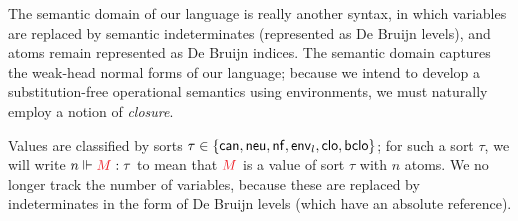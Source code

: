 \documentclass{article}
\DeclarePairedDelimiter\Angles{\langle}{\rangle}
\DeclarePairedDelimiter\Squares{[}{]}
\DeclarePairedDelimiter\Braces{\lbrace}{\rbrace}
\newcommand\FmtKwd[1]{\mathsf{#1}}
\newcommand\FmtThin[1]{{\color{ProcessBlue}#1}}
\newcommand\FmtTm[1]{{\color{Violet}#1}}
\newcommand\FmtVal[1]{{\color{Red}{#1}}}
\begin{document}
The semantic domain of our language is really another syntax, in which
variables are replaced by semantic indeterminates (represented as De
Bruijn levels), and atoms remain represented as De Bruijn indices. The
semantic domain captures the weak-head normal forms of our language;
because we intend to develop a substitution-free operational semantics
using environments, we must naturally employ a notion of
\emph{closure}.

\newcommand\SortCan{\FmtKwd{can}}
\newcommand\SortNeu{\FmtKwd{neu}}
\newcommand\SortNf{\FmtKwd{nf}}
\newcommand\SortClo{\FmtKwd{clo}}
\newcommand\SortBClo{\FmtKwd{bclo}}
\newcommand\SortEnv[1]{\FmtKwd{env}_{#1}}
\newcommand\IsVal[3]{{#1}\Vdash\FmtVal{#2}:{#3}}
\newcommand\Val[2]{{#1}\Vdash{#2}}

\newcommand\Clo[4]{
  \Squares*{
    \FmtThin{#1}%
    \mathbin{\color{gray}*}%
    \Angles*{
      \FmtTm{#4}
      \mathbin{\color{gray}\triangleleft}%
      \FmtThin{#2}
      \mathbin{\color{gray}*}%
      \FmtVal{#3}
    }
  }
}

\newcommand\BClo[4]{
  \Squares*{
    \FmtThin{#1}%
    \mathbin{\color{gray}*}%
    \Angles*{
      \FmtTm{#4}
      \mathbin{\color{gray}\triangleleft^+}%
      \FmtThin{#2}
      \mathbin{\color{gray}*}%
      \FmtVal{#3}
    }
  }
}


Values are classified by sorts
$\tau\in\Braces*{\SortCan,\SortNeu,\SortNf,\SortEnv{l},\SortClo,\SortBClo}$; for
such a sort $\tau$, we will write $\IsVal{n}{M}{\tau}$ to mean that
$\FmtVal{M}$ is a value of sort $\tau$ with $n$ atoms. We no longer
track the number of variables, because these are replaced by
indeterminates in the form of De Bruijn levels (which have an absolute
reference).
\end{document}
